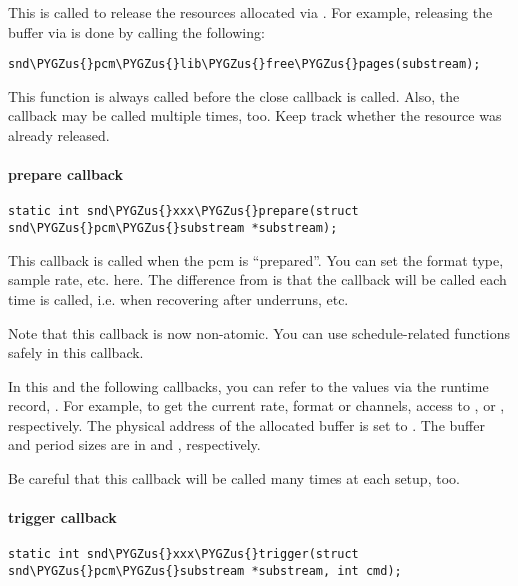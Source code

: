 \documentclass[a4paper,8pt,english]{sphinxmanual}
\def\PYGZus{\char`\_}
\begin{document}
This is called to release the resources allocated via
. For example, releasing the buffer via
 is done by calling the
following:

\begin{Verbatim}[commandchars=\\\{\}]
snd\PYGZus{}pcm\PYGZus{}lib\PYGZus{}free\PYGZus{}pages(substream);
\end{Verbatim}

This function is always called before the close callback is called.
Also, the callback may be called multiple times, too. Keep track
whether the resource was already released.


\paragraph{prepare callback}
\label{sound/kernel-api/writing-an-alsa-driver:prepare-callback}
\begin{Verbatim}[commandchars=\\\{\}]
static int snd\PYGZus{}xxx\PYGZus{}prepare(struct snd\PYGZus{}pcm\PYGZus{}substream *substream);
\end{Verbatim}

This callback is called when the pcm is “prepared”. You can set the
format type, sample rate, etc. here. The difference from 
is that the  callback will be called each time
{\hyperref[sound/kernel\string-api/alsa\string-driver\string-api:c.snd_pcm_prepare]{\emph{}}} is called, i.e. when recovering after
underruns, etc.

Note that this callback is now non-atomic. You can use
schedule-related functions safely in this callback.

In this and the following callbacks, you can refer to the values via
the runtime record, . For example, to get the
current rate, format or channels, access to ,
 or , respectively. The
physical address of the allocated buffer is set to
. The buffer and period sizes are in
 and , respectively.

Be careful that this callback will be called many times at each setup,
too.


\paragraph{trigger callback}
\label{sound/kernel-api/writing-an-alsa-driver:trigger-callback}
\begin{Verbatim}[commandchars=\\\{\}]
static int snd\PYGZus{}xxx\PYGZus{}trigger(struct snd\PYGZus{}pcm\PYGZus{}substream *substream, int cmd);
\end{Verbatim}
\end{document}
